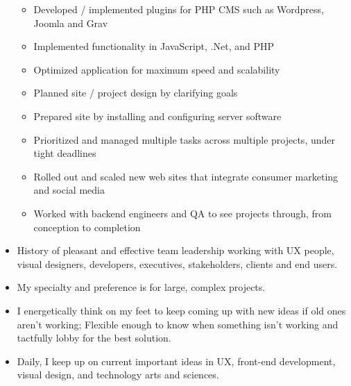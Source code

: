 \documentclass{resume}
\begin{document}
\begin{itemize}
\begin{itemize}
      \item Developed / implemented plugins for PHP CMS such as Wordpress, Joomla and Grav
      \item Implemented functionality in JavaScript, .Net, and PHP
      \item Optimized application for maximum speed and scalability
      \item Planned site / project design by clarifying goals
      \item Prepared site by installing and configuring server software
      \item Prioritized and managed multiple tasks across multiple projects, under tight deadlines
      \item Rolled out and scaled new web sites that integrate consumer marketing and social media
      \item Worked with backend engineers and QA to see projects through, from conception to completion
    \end{itemize}
    \item History of pleasant and effective team leadership working with UX people, visual designers, developers, executives, stakeholders, clients and end users.
    \item My specialty and preference is for large, complex projects.
    \item I energetically think on my feet to keep coming up with new ideas if old ones aren’t working; Flexible enough to know when something isn’t working and tactfully lobby for the best solution.
    \item Daily, I keep up on current important ideas in UX, front-end development, visual design, and technology arts and sciences.
  \end{itemize}
\end{document}
